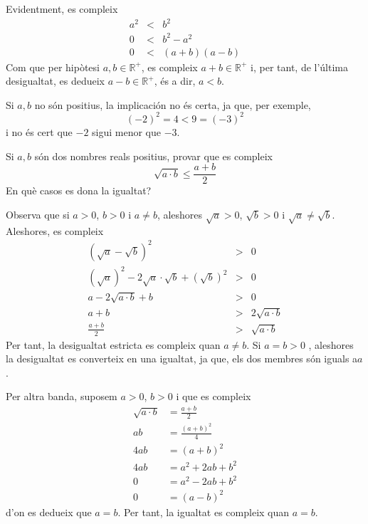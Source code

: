 \begin{solucio}
Evidentment, es compleix%
\begin{align*}
a^{2} &<&b^{2} \\
0 &<&b^{2}-a^{2} \\
0 &<&(a+b)(a-b)
\end{align*}%
Com que per hipòtesi $a,b\in \mathbb{R}^{+}$, es compleix $a+b\in 
\mathbb{R}^{+}$ i, per tant, de l’última desigualtat, es dedueix $%
a-b\in \mathbb{R}^{+}$, és a dir, $a<b$.

Si $a,b$ no són positius, la implicación no és certa, ja que, per
exemple,%
\begin{equation*}
(-2)^{2}=4<9=(-3)^{2}
\end{equation*}%
i no és cert que $-2$ sigui menor que $-3$.
\end{solucio}

\begin{exercici}
Si $a,b$ són dos nombres reals positius, provar que es compleix%
\begin{equation*}
\sqrt{a\cdot b}\leq \frac{a+b}{2}
\end{equation*}%
En què casos es dona la igualtat?

\end{exercici}

\begin{solucio}
Observa que si $a>0$, $b>0$ i $a\neq b$, aleshores $\sqrt{a}>0$, $\sqrt{b}>0$
i $\sqrt{a}\neq \sqrt{b}$. Aleshores, es compleix%
\begin{align*}
\left( \sqrt{a}-\sqrt{b}\right) ^{2} &>&0 \\
\left( \sqrt{a}\right) ^{2}-2\sqrt{a}\cdot \sqrt{b}+\left( \sqrt{b}\right)
^{2} &>&0 \\
a-2\sqrt{a\cdot b}+b &>&0 \\
a+b &>&2\sqrt{a\cdot b} \\
\frac{a+b}{2} &>&\sqrt{a\cdot b}
\end{align*}%
Per tant, la desigualtat estricta es compleix quan $a\neq b$. Si $a=b>0$%
, aleshores la desigualtat es converteix en una igualtat, ja que, els dos
membres són iguals a$a$.

Per altra banda, suposem $a>0$, $b>0$ i que es compleix%
\begin{align*}
\sqrt{a\cdot b} &=\frac{a+b}{2} \\
ab &=\frac{(a+b)^{2}}{4} \\
4ab &=(a+b)^{2} \\
4ab &=a^{2}+2ab+b^{2} \\
0 &=a^{2}-2ab+b^{2} \\
0 &=(a-b)^{2}
\end{align*}%
d’on es dedueix que $a=b$. Per tant, la igualtat es compleix quan $a=b$.
\end{solucio}

